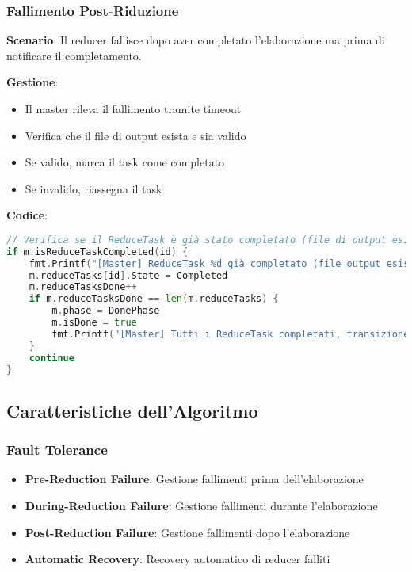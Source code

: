 \documentclass[12pt,a4paper]{article}
\begin{document}
\subsubsection{Fallimento Post-Riduzione}

\textbf{Scenario}: Il reducer fallisce dopo aver completato l'elaborazione ma prima di notificare il completamento.

\textbf{Gestione}:
\begin{itemize}
\item Il master rileva il fallimento tramite timeout
\item Verifica che il file di output esista e sia valido
\item Se valido, marca il task come completato
\item Se invalido, riassegna il task
\end{itemize}

\textbf{Codice}:
\begin{lstlisting}[language=go]
// Verifica se il ReduceTask è già stato completato (file di output esistente)
if m.isReduceTaskCompleted(id) {
    fmt.Printf("[Master] ReduceTask %d già completato (file output esistente), marco come Completed\n", id)
    m.reduceTasks[id].State = Completed
    m.reduceTasksDone++
    if m.reduceTasksDone == len(m.reduceTasks) {
        m.phase = DonePhase
        m.isDone = true
        fmt.Printf("[Master] Tutti i ReduceTask completati, transizione a DonePhase\n")
    }
    continue
}
\end{lstlisting}

\subsection{Caratteristiche dell'Algoritmo}

\subsubsection{Fault Tolerance}

\begin{itemize}
\item \textbf{Pre-Reduction Failure}: Gestione fallimenti prima dell'elaborazione
\item \textbf{During-Reduction Failure}: Gestione fallimenti durante l'elaborazione
\item \textbf{Post-Reduction Failure}: Gestione fallimenti dopo l'elaborazione
\item \textbf{Automatic Recovery}: Recovery automatico di reducer falliti
\end{itemize}
\end{document}
